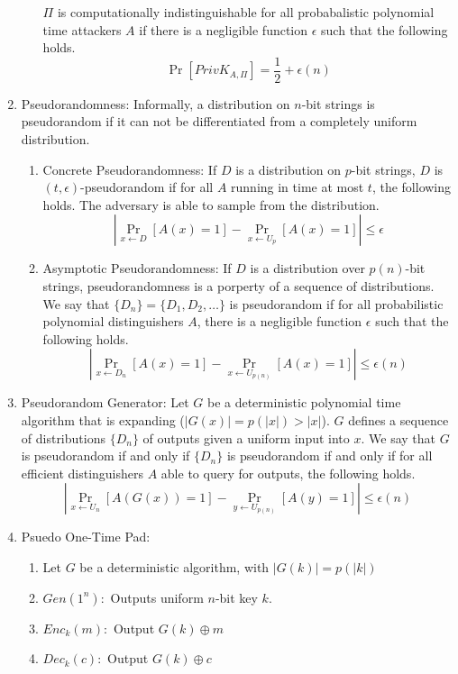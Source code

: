 \documentclass[12pt,letterpaper]{article}
\begin{document}
\begin{enumerate}
\begin{enumerate}
                    $\Pi$ is computationally indistinguishable for all probabalistic polynomial time attackers $A$ if there is a negligible function $\epsilon$ such that the following holds.
                    \[\Pr[PrivK_{A,\Pi}]=\frac{1}{2}+\epsilon(n)\]
            \end{enumerate}\newpage
    \item Pseudorandomness: Informally, a distribution on $n$-bit strings is pseudorandom if it can not be differentiated from a completely uniform distribution.
        \begin{enumerate}
            \item Concrete Pseudorandomness: If $D$ is a distribution on $p$-bit strings, $D$ is $(t,\epsilon)$-pseudorandom if for all $A$ running in time at most $t$, the following holds. The adversary is able to sample from the distribution.
                \[\left|\Pr_{x\leftarrow D}[A(x)=1]-\Pr_{x\leftarrow U_p}[A(x)=1]\right|\leq\epsilon\]
            \item Asymptotic Pseudorandomness: If $D$ is a distribution over $p(n)$-bit strings, pseudorandomness is a porperty of a sequence of distributions. We say that $\{D_n\}=\{D_1,D_2,\ldots\}$ is pseudorandom if for all probabilistic polynomial distinguishers $A$, there is a negligible function $\epsilon$ such that the following holds.
                \[\left|\Pr_{x\leftarrow D_n}[A(x)=1]-\Pr_{x\leftarrow U_{p(n)}}[A(x)=1]\right|\leq \epsilon(n)\]
        \end{enumerate}
    \item Pseudorandom Generator: Let $G$ be a deterministic polynomial time algorithm that is expanding ($|G(x)|=p(|x|)>|x|$). $G$ defines a sequence of distributions $\{D_n\}$ of outputs given a uniform input into $x$. We say that $G$ is pseudorandom if and only if $\{D_n\}$ is pseudorandom if and only if for all efficient distinguishers $A$ able to query for outputs, the following holds.
    \[\left|\Pr_{x\leftarrow U_n}[A(G(x))=1]-\Pr_{y\leftarrow U_{p(n)}}[A(y)=1]\right|\leq\epsilon(n)\]\newpage
    \item
        Psuedo One-Time Pad:
        \begin{enumerate}
            \item Let $G$ be a deterministic algorithm, with $|G(k)|=p(|k|)$
            \item $Gen(1^n):$ Outputs uniform $n$-bit key $k$.
            \item $Enc_k(m):$ Output $G(k)\oplus m$
            \item $Dec_k(c):$ Output $G(k)\oplus c$\bigskip\newline

\end{enumerate}
\end{enumerate}
\end{document}
